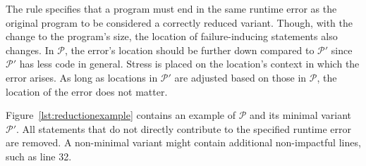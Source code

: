 The rule specifies that a program must end in the same runtime error 
as the original program to be considered a correctly reduced variant.
Though, with the change to the program's size, the location 
of failure-inducing statements also changes.
In $\mathcal{P}$, the error's location should be further down compared to 
$\mathcal{P'}$ since $\mathcal{P'}$ has less code in general.
Stress is placed on the location's context in which the error arises.
As long as locations in $\mathcal{P'}$ are adjusted based on those in 
$\mathcal{P}$, the location of the error does not matter.

Figure~\ref{lst:reductionexample} contains an example of $\mathcal{P}$ and its 
minimal variant $\mathcal{P'}$. 
All statements that do not directly contribute to the specified 
runtime error are removed.
A non-minimal variant might contain additional non-impactful lines, 
such as line 32.

